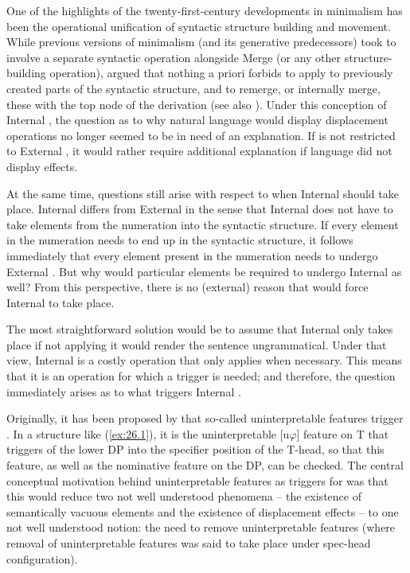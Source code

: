 \documentclass[output=paper]{langsci/langscibook}
\begin{document}
One of the highlights of the twenty-first-century developments in minimalism
has been the operational unification of syntactic structure building and
movement. While previous versions of minimalism (and its generative
predecessors) took  to involve a separate syntactic operation alongside
Merge (or any other structure-building operation), \citet{Chomsky2005} argued
that nothing a priori forbids  to apply to previously created parts
of the syntactic structure, and to remerge, or internally merge, these with the
top node of the derivation (see also \citealt{Starke2001}). Under this
conception of Internal , the question as to why natural language
would display displacement operations no longer seemed to be in need of an
explanation. If  is not restricted to External , it would
rather require additional explanation if language did not display 
effects.

At the same time, questions still arise with respect to when Internal 
should take place. Internal  differs from External  in
the sense that Internal  does not have to take elements from the
numeration into the syntactic structure. If every element in the numeration
needs to end up in the syntactic structure, it follows immediately that every
element present in the numeration needs to undergo External . But
why would particular elements be required to undergo Internal  as
well? From this perspective, there is no (external) reason that would force
Internal  to take place.

The most straightforward solution would be to assume that Internal 
only takes place if not applying it would render the sentence ungrammatical.
Under that view, Internal  is a costly operation that only applies
when necessary. This means that it is an operation for which a trigger is
needed; and therefore, the question immediately arises as to what triggers
Internal .

Originally, it has been proposed by \citet{Chomsky1995} that so-called
uninterpretable features trigger . In a structure like
(\ref{ex:26.1}), it is the uninterpretable [u${\varphi}$] feature on T that
triggers  of the lower DP into the specifier position of the T-head, so
that this feature, as well as the nominative feature on the DP, can be checked.
The central conceptual motivation behind uninterpretable features as triggers
for  was that this would reduce two not well understood phenomena
– the existence of semantically vacuous elements and the existence of
displacement effects – to one not well understood notion: the need to remove
uninterpretable features (where removal of uninterpretable features was said to
take place under spec-head configuration).
\end{document}
